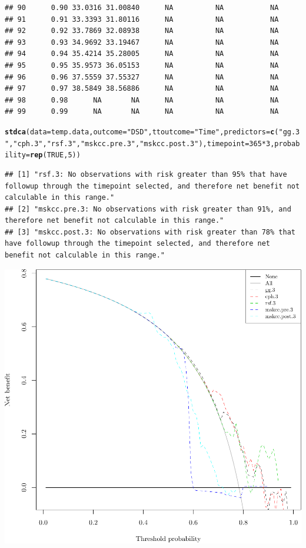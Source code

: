 \documentclass{article}\usepackage[]{graphicx}\usepackage[]{color}
\makeatletter
\def\maxwidth{ %
  \ifdim\Gin@nat@width>\linewidth
    \linewidth
  \else
    \Gin@nat@width
  \fi
}
\newcommand{\hlnum}[1]{\textcolor[rgb]{0.686,0.059,0.569}{#1}}%
\newcommand{\hlstr}[1]{\textcolor[rgb]{0.192,0.494,0.8}{#1}}%
\newcommand{\hlopt}[1]{\textcolor[rgb]{0,0,0}{#1}}%
\newcommand{\hlstd}[1]{\textcolor[rgb]{0.345,0.345,0.345}{#1}}%
\newcommand{\hlkwc}[1]{\textcolor[rgb]{0.333,0.667,0.333}{#1}}%
\newcommand{\hlkwd}[1]{\textcolor[rgb]{0.737,0.353,0.396}{\textbf{#1}}}%
\newenvironment{kframe}{%
 \def\at@end@of@kframe{}%
 \ifinner\ifhmode%
  \def\at@end@of@kframe{\end{minipage}}%
  \begin{minipage}{\columnwidth}%
 \fi\fi%
 \def\FrameCommand##1{\hskip\@totalleftmargin \hskip-\fboxsep
 \colorbox{shadecolor}{##1}\hskip-\fboxsep
     \hskip-\linewidth \hskip-\@totalleftmargin \hskip\columnwidth}%
 \MakeFramed {\advance\hsize-\width
   \@totalleftmargin\z@ \linewidth\hsize
   \@setminipage}}%
 {\par\unskip\endMakeFramed%
 \at@end@of@kframe}
\newenvironment{knitrout}{}{} %
\makeatother
\begin{document}
\begin{knitrout}
\begin{kframe}
\begin{verbatim}
## 90      0.90 33.0316 31.00840      NA          NA           NA
## 91      0.91 33.3393 31.80116      NA          NA           NA
## 92      0.92 33.7869 32.08938      NA          NA           NA
## 93      0.93 34.9692 33.19467      NA          NA           NA
## 94      0.94 35.4214 35.28005      NA          NA           NA
## 95      0.95 35.9573 36.05153      NA          NA           NA
## 96      0.96 37.5559 37.55327      NA          NA           NA
## 97      0.97 38.5849 38.56886      NA          NA           NA
## 98      0.98      NA       NA      NA          NA           NA
## 99      0.99      NA       NA      NA          NA           NA
\end{verbatim}
\begin{alltt}
\hlkwd{stdca}\hlstd{(}\hlkwc{data} \hlstd{= temp.data,} \hlkwc{outcome} \hlstd{=} \hlstr{"DSD"}\hlstd{,} \hlkwc{ttoutcome} \hlstd{=} \hlstr{"Time"}\hlstd{,} \hlkwc{predictors} \hlstd{=} \hlkwd{c}\hlstd{(}\hlstr{"gg.3"}\hlstd{,} \hlstr{"cph.3"}\hlstd{,} \hlstr{"rsf.3"}\hlstd{,} \hlstr{"mskcc.pre.3"}\hlstd{,} \hlstr{"mskcc.post.3"}\hlstd{),} \hlkwc{timepoint} \hlstd{=} \hlnum{365}\hlopt{*}\hlnum{3}\hlstd{,} \hlkwc{probability} \hlstd{=} \hlkwd{rep}\hlstd{(}\hlnum{TRUE}\hlstd{,} \hlnum{5}\hlstd{))}
\end{alltt}
\begin{verbatim}
## [1] "rsf.3: No observations with risk greater than 95% that have followup through the timepoint selected, and therefore net benefit not calculable in this range."       
## [2] "mskcc.pre.3: No observations with risk greater than 91%, and therefore net benefit not calculable in this range."                                                   
## [3] "mskcc.post.3: No observations with risk greater than 78% that have followup through the timepoint selected, and therefore net benefit not calculable in this range."
\end{verbatim}
\end{kframe}

{\centering \includegraphics[width=\maxwidth]{figure/05-model-selection-dca-3} 

}
\end{knitrout}
\end{document}
